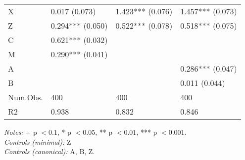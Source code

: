 \begin{center}
\begin{longtable}{@{}p{\dimexpr(\textwidth - 6\tabcolsep)/4\relax}p{\dimexpr(\textwidth - 6\tabcolsep)/4\relax}p{\dimexpr(\textwidth - 6\tabcolsep)/4\relax}p{\dimexpr(\textwidth - 6\tabcolsep)/4\relax}@{}}
\textnormal{X} & 0.017 (0.073) & 1.423*** (0.076) & 1.457*** (0.073) \\
\textnormal{Z} & 0.294*** (0.050) & 0.522*** (0.078) & 0.518*** (0.075) \\
\textnormal{C} & 0.621*** (0.032) &  &  \\
\textnormal{M} & 0.290*** (0.041) &  &  \\
\textnormal{A} &  &  & 0.286*** (0.047) \\
\textnormal{B} &  &  & 0.011 (0.044) \\
\textnormal{Num.Obs.} & 400 & 400 & 400 \\
\textnormal{R2} & 0.938 & 0.832 & 0.846 \\
\bottomrule
\end{longtable}
\endgroup
\end{center}
{\footnotesize \emph{Notes:} + p $< 0.1$, * p $< 0.05$, ** p $< 0.01$, *** p $< 0.001$.\\
\hspace*{1.5em}\textit{Controls (minimal):} {Z}\\
\hspace*{1.5em}\textit{Controls (canonical):} {A, B, Z}.}
\endgroup
